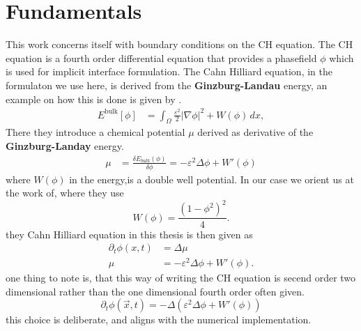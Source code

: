 \documentclass{mimosis}
\begin{document}
\chapter{Fundamentals}
\label{sec:org755846c}
This work concerns itself with boundary conditions on the CH equation. The CH equation is a fourth order differential equation that provides a phasefield \(\phi\) which is used for implicit interface formulation. The Cahn Hilliard equation, in the formulaton we use here, is derived from the \textbf{Ginzburg-Landau} energy, an example on how this is done is given by \autocite{Wu_2022}.
\begin{align}
\label{eq:energy}
E^{\text{bulk}}[\phi] &= \int_{\Omega} \frac{\varepsilon^2}{2} |\nabla \phi |^2 + W(\phi) \, dx ,
\end{align}
There they introduce a chemical potential \(\mu\) derived as derivative of the \textbf{Ginzburg-Landay} energy.
\begin{align}
\label{eq:chemical-potential}
 \mu &= \frac{\delta E_{bulk}(\phi)}{\delta \phi} = -\varepsilon^2 \Delta \phi + W'(\phi)
\end{align}
where \(W(\phi)\) in the energy,is a double well potential. In our case we orient us at the work of\autocite{SHIN20117441}, where they use
\begin{equation}
\label{eq:6}
W(\phi) = \frac{(1-\phi^2)^2}{4}.
\end{equation}
they Cahn Hilliard equation in this thesis is then given as
\begin{equation}
\begin{aligned}
\partial_{t}\phi(x,t) &=  \Delta\mu \\
\mu &= - \varepsilon^2 \Delta\phi  + W'(\phi).
\end{aligned}
\end{equation}
one thing to note is, that this way of writing the CH equation is secend order two dimensional rather than the one dimensional fourth order often given.
\begin{equation}
\label{eq:7}
\partial_t \phi(\vec{x} , t) = - \Delta(\varepsilon^2  \Delta \phi + W\prime(\phi))
\end{equation}
this choice is deliberate, and aligns with the numerical implementation.
\end{document}
